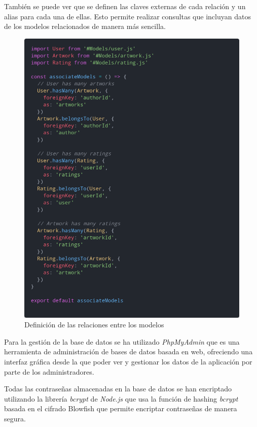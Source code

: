 También se puede ver que se definen las claves externas de cada relación y un alias para
cada una de ellas. Esto permite realizar consultas que incluyan datos de los modelos
relacionados de manera más sencilla.

\begin{figure}[H]
  \centering
  \includegraphics[width=1\textwidth]{img/associate-models}
  \caption{Definición de las relaciones entre los modelos}
  \label{fig:associate-models}
\end{figure}

Para la gestión de la base de datos se ha utilizado \textit{PhpMyAdmin} \cite{phpmyadmin}
que es una herramienta de administración de bases de datos basada en web, ofreciendo una
interfaz gráfica desde la que poder ver y gestionar los datos de la aplicación por parte
de los administradores.

Todas las contraseñas almacenadas en la base de datos se han encriptado utilizando
la librería \textit{bcrypt} \cite{bcrypt-nodejs} de \textit{Node.js} \cite{nodejs} que usa
la función de hashing \textit{bcrypt} \cite{bcrypt} basada en el cifrado Blowfish que
permite encriptar contraseñas de manera segura.


